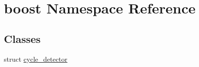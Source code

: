 \hypertarget{namespaceboost}{\section{boost \-Namespace \-Reference}
\label{namespaceboost}
}
\subsection*{\-Classes}
\begin{DoxyCompactItemize}
\item 
struct \hyperlink{structboost_1_1cycle__detector}{cycle\-\_\-detector}
\end{DoxyCompactItemize}
